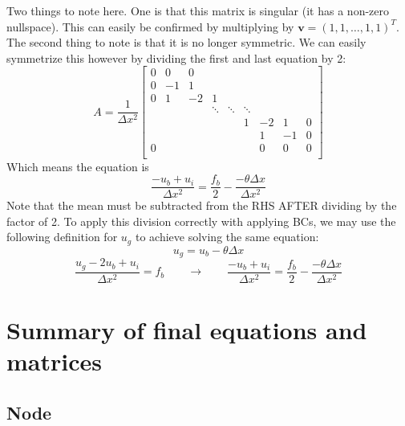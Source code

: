 \documentclass[landscape]{article}
\begin{document}
Two things to note here. One is that this matrix is singular (it has a non-zero nullspace). This can easily be confirmed by multiplying by $\mathbf{v} = (1,1,\dots,1,1)^T$. The second thing to note is that it is no longer symmetric. We can easily symmetrize this however by dividing the first and last equation by 2:
\[A = \frac{1}{\Delta x^2} \left[\begin{array}{ccccccccc}
0  & 0     & 0         &           &           &           &           &         &    \\
0  & -1    & 1         &           &           &           &           &         &    \\
0  & 1     & -2        & 1         &           &           &           &         &    \\
   &       &           & \ddots    & \ddots    & \ddots    &           &         &    \\
   &       &           &           &           & 1         & -2        & 1       &  0 \\
   &       &           &           &           &           &  1        & -1      &  0 \\
0  &       &           &           &           &           &  0        & 0       &  0 \\
\end{array} \right]
\]
Which means the equation is
\begin{equation}
   \frac{- u_b + u_i}{\Delta x^2} = \frac{f_b}{2}  - \frac{-\theta \Delta x}{\Delta x^2}
\end{equation}
Note that the mean must be subtracted from the RHS AFTER dividing by the factor of 2. To apply this division correctly with applying BCs, we may use the following definition for $u_g$ to achieve solving the same equation:
\begin{equation}
  \boxed{
  u_g = u_b - \theta \Delta x
  }
\end{equation}
\begin{equation}
   \frac{u_g - 2 u_b + u_i}{\Delta x^2} = f_b
   \qquad \rightarrow \qquad
   \frac{- u_b + u_i}{\Delta x^2} = \frac{f_b}{2} - \frac{- \theta \Delta x}{\Delta x^2}
\end{equation}

\newpage

\section{Summary of final equations and matrices}
\subsection{Node}
\end{document}

